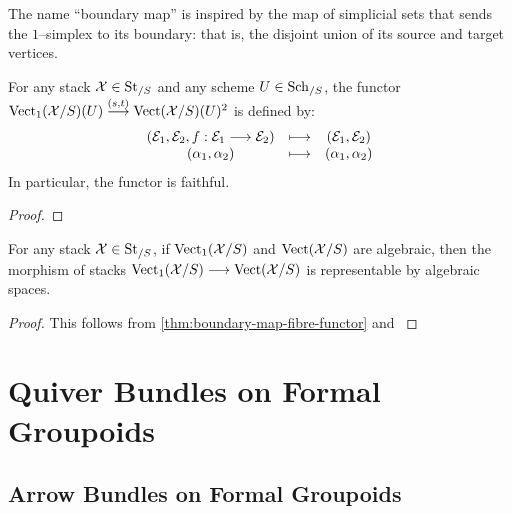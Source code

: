 \documentclass[11pt]{amsart}
\begin{document}
\begin{rmk}
The name ``boundary map'' is inspired by the map of simplicial sets
that sends the $1$--simplex to its boundary: that is, the disjoint union
of its source and target vertices.
\end{rmk}

\begin{thm}\label{thm:boundary-map-fibre-functor}
For any stack $\mathcal{X} \in \mathrm{St}_{/S}$ and any scheme $U \in \mathrm{Sch}_{/S}$,
the functor $\Vect_1(\mcX/S)(U) \to[{(s, t)}] \Vect(\mcX/S)(U)^2$
is defined by:
\[\begin{array}{ccc}
(\mc{E}_1, \mc{E}_2, f : \mc{E}_1 \to \mc{E}_2)
&\mapsto& (\mc{E}_1, \mc{E}_2) \\
(\alpha_1, \alpha_2) & \mapsto & (\alpha_1, \alpha_2)
\end{array}\]
In particular, the functor is faithful.
\end{thm}
\begin{proof}
\end{proof}

\begin{cor}
For any stack $\mathcal{X} \in \mathrm{St}_{/S}$, if $\mathrm{Vect}_1(\mathcal{X}/S)$ and $\mathrm{Vect}(\mathcal{X}/S)$
are algebraic, then the morphism of stacks
$\Vect_1(\mcX/S) \to \Vect(\mcX/S)$ is representable by algebraic spaces.
\end{cor}
\begin{proof}
This follows from \cref{thm:boundary-map-fibre-functor} and
\cite[\href{https://stacks.math.columbia.edu/tag/04Y5}{Lemma 04Y5}]
{stacks-project}
\end{proof}


\section{Quiver Bundles on Formal Groupoids}

\subsection{Arrow Bundles on Formal Groupoids}
\end{document}
